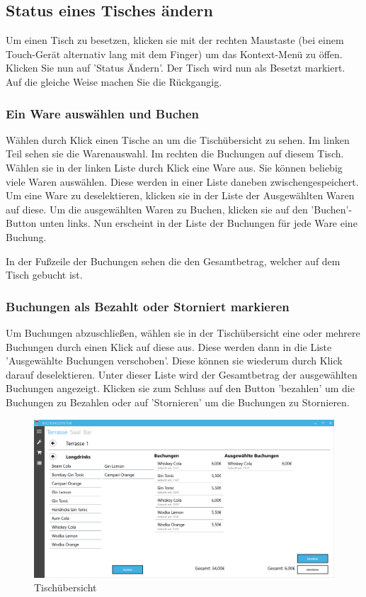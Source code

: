 \subsection{Status eines Tisches ändern}

Um einen Tisch zu besetzen, klicken sie mit der rechten Maustaste (bei einem Touch-Gerät alternativ lang mit dem Finger) um das Kontext-Menü zu öffen. Klicken Sie nun auf 'Status Ändern'. 
Der Tisch wird nun als Besetzt markiert. Auf die gleiche Weise machen Sie die Rückgangig.

\subsubsection{Ein Ware auswählen und Buchen}

Wählen durch Klick einen Tische an um die Tischübersicht zu sehen. Im linken Teil sehen sie die Warenauswahl. Im rechten die Buchungen auf diesem Tisch. 
Wählen sie in der linken Liste durch Klick eine Ware aus. Sie können beliebig viele Waren auswählen. Diese werden in einer Liste daneben zwischengespeichert. Um eine Ware zu deselektieren, klicken sie in der Liste der Ausgewählten Waren auf diese.
Um die ausgewählten Waren zu Buchen, klicken sie auf den 'Buchen'-Button unten links. Nun erscheint in der Liste der Buchungen für jede Ware eine Buchung.

In der Fußzeile der Buchungen sehen die den Gesamtbetrag, welcher auf dem Tisch gebucht ist.

\subsubsection{Buchungen als Bezahlt oder Storniert markieren}

Um Buchungen abzuschließen, wählen sie in der Tischübersicht eine oder mehrere Buchungen durch einen Klick auf diese aus. Diese werden dann in die Liste 'Ausgewählte Buchungen verschoben'. Diese können sie wiederum durch Klick darauf deselektieren.
Unter dieser Liste wird der Gesamtbetrag der ausgewählten Buchungen angezeigt. Klicken sie zum Schluss auf den Button 'bezahlen' um die Buchungen zu Bezahlen oder auf 'Stornieren' um die Buchungen zu Stornieren.

\begin{figure}[h]
	\begin{center}
		\includegraphics[width=\columnwidth]{Benutzerhandbuch/Buchungen.png}
	\end{center}
	\caption{Tischübersicht}
	\label{fig:table-overview}
\end{figure}

